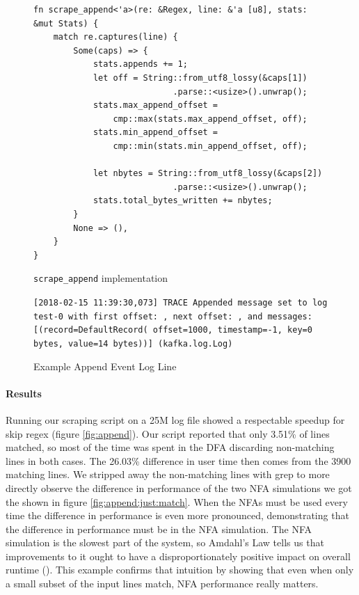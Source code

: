 \begin{figure}
\caption{\texttt{scrape\_append} implementation}
\label{fig:scrapeappendimpl}

\begin{verbatim}
fn scrape_append<'a>(re: &Regex, line: &'a [u8], stats: &mut Stats) {
    match re.captures(line) {
        Some(caps) => {
            stats.appends += 1;
            let off = String::from_utf8_lossy(&caps[1])
                            .parse::<usize>().unwrap();
            stats.max_append_offset =
                cmp::max(stats.max_append_offset, off);
            stats.min_append_offset =
                cmp::min(stats.min_append_offset, off);

            let nbytes = String::from_utf8_lossy(&caps[2])
                            .parse::<usize>().unwrap();
            stats.total_bytes_written += nbytes;
        }
        None => (),
    }
}
\end{verbatim}
\end{figure}


\begin{figure}
\caption{Example Append Event Log Line}
\label{fig:appendevent}

\texttt{[2018-02-15 11:39:30,073] \allowbreak TRACE Appended \allowbreak
message set \allowbreak to log \allowbreak test-0 with \allowbreak
first offset: , next offset: , and
messages: [(record=\allowbreak DefaultRecord(\allowbreak
offset=1000, \allowbreak timestamp=-1, \allowbreak key=0 bytes,
 value=14 \allowbreak bytes))] \allowbreak(kafka.log.Log)
}
\end{figure}

\paragraph{Results}

Running our scraping script on a 25M log file showed a
respectable speedup for skip regex (figure \ref{fig:append}).
Our script reported that only 3.51\% of lines matched, so
most of the time was spent in the DFA discarding non-matching
lines in both cases. The 26.03\% difference in user
time then comes from the 3900 matching lines. We stripped
away the non-matching lines with grep to more directly observe
the difference in performance of the two NFA simulations we got
the shown in figure \ref{fig:append:just:match}.
When the NFAs must be used every time the difference in performance
is even more pronounced, demonstrating that the difference in performance
must be in the NFA simulation. The NFA simulation is the slowest part of
the system, so Amdahl's Law tells us that improvements to it ought to have
a disproportionately positive impact on overall runtime (\cite{Amdahl1967}).
This example confirms that intuition by showing that even when only a small
subset of the input lines match, NFA performance really matters.

